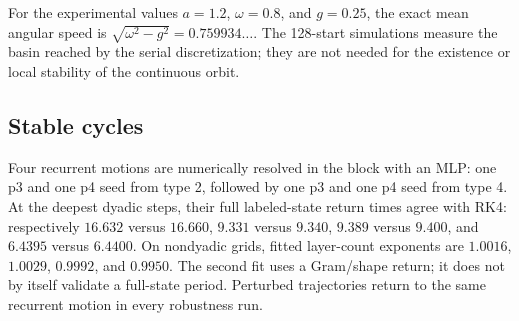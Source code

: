 \documentclass[11pt,a4paper]{article}
\theoremstyle{definition}
\begin{document}
For the experimental values $a=1.2$, $\omega=0.8$, and $g=0.25$, the exact mean
angular speed is $\sqrt{\omega^2-g^2}=0.759934\ldots$.  The 128-start simulations
measure the basin reached by the serial discretization; they are not needed for the
existence or local stability of the continuous orbit.

\subsection{Stable cycles}

Four recurrent motions are numerically resolved in the block with an MLP: one p3 and
one p4 seed from type 2, followed by one p3 and one p4 seed from type 4.  At the
deepest dyadic steps, their full labeled-state return times agree with RK4:
respectively $16.632$ versus $16.660$, $9.331$ versus $9.340$, $9.389$ versus
$9.400$, and $6.4395$ versus $6.4400$.  On nondyadic grids, fitted layer-count
exponents are $1.0016$, $1.0029$, $0.9992$, and $0.9950$.  The second fit uses a
Gram/shape return; it does not by itself validate a full-state period.  Perturbed
trajectories return to the same recurrent motion in every robustness run.
\end{document}
